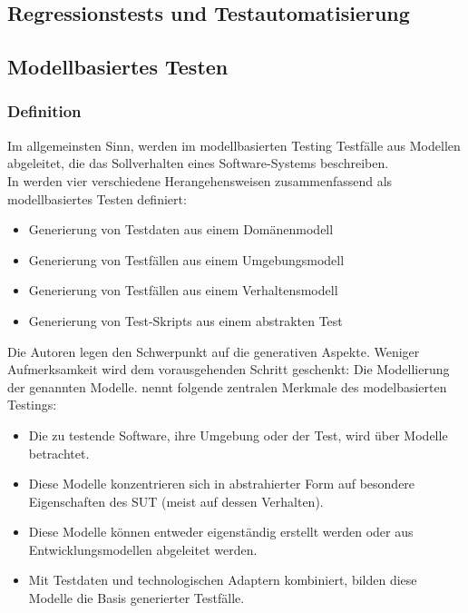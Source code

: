 \subsection{Regressionstests und Testautomatisierung}
\subsection{Modellbasiertes Testen}
\subsubsection{Definition}
Im allgemeinsten Sinn, werden im modellbasierten Testing Testfälle aus Modellen abgeleitet, die das Sollverhalten eines Software-Systems beschreiben. \cite{sensler_testautomatisierung_2011}\\

In \cite{utting_practical_2007} werden vier verschiedene Herangehensweisen zusammenfassend als modellbasiertes Testen definiert:

\begin{itemize}
\item Generierung von Testdaten aus einem Domänenmodell
\item Generierung von Testfällen aus einem Umgebungsmodell
\item Generierung von Testfällen aus einem Verhaltensmodell
\item Generierung von Test-Skripts aus einem abstrakten Test
\end{itemize}

Die Autoren legen den Schwerpunkt auf die generativen Aspekte. Weniger Aufmerksamkeit wird dem vorausgehenden Schritt geschenkt: Die Modellierung der genannten Modelle. \cite{rossner_basiswissen_2010} nennt folgende  zentralen Merkmale des modelbasierten Testings:

\begin{itemize}
\item Die zu testende Software, ihre Umgebung oder der Test, wird über Modelle betrachtet.
\item Diese Modelle konzentrieren sich in abstrahierter Form auf besondere Eigenschaften des SUT (meist auf dessen Verhalten).
\item Diese Modelle können entweder eigenständig erstellt werden oder aus Entwicklungsmodellen abgeleitet werden.
\item Mit Testdaten und technologischen Adaptern kombiniert, bilden diese Modelle die Basis generierter Testfälle.
\end{itemize}

